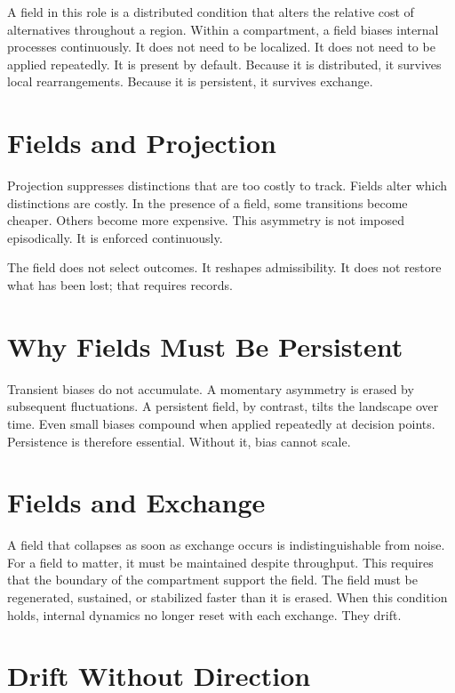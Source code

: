 \documentclass[11pt,twoside,openright]{book}
\begin{document}
A field in this role is a distributed condition that alters the relative cost of alternatives throughout a region. Within a compartment, a field biases internal processes continuously. It does not need to be localized. It does not need to be applied repeatedly. It is present by default. Because it is distributed, it survives local rearrangements. Because it is persistent, it survives exchange.

\section*{Fields and Projection}

Projection suppresses distinctions that are too costly to track. Fields alter which distinctions are costly. In the presence of a field, some transitions become cheaper. Others become more expensive. This asymmetry is not imposed episodically. It is enforced continuously.

The field does not select outcomes. It reshapes admissibility. It does not restore what has been lost; that requires records.

\section*{Why Fields Must Be Persistent}

Transient biases do not accumulate. A momentary asymmetry is erased by subsequent fluctuations. A persistent field, by contrast, tilts the landscape over time. Even small biases compound when applied repeatedly at decision points. Persistence is therefore essential. Without it, bias cannot scale.

\section*{Fields and Exchange}

A field that collapses as soon as exchange occurs is indistinguishable from noise. For a field to matter, it must be maintained despite throughput. This requires that the boundary of the compartment support the field. The field must be regenerated, sustained, or stabilized faster than it is erased. When this condition holds, internal dynamics no longer reset with each exchange. They drift.

\section*{Drift Without Direction}
\end{document}
